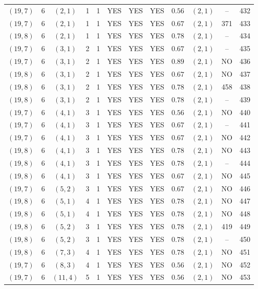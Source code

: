 \begin{longtable}{|c|c|c|c|c|c|c|c|c|c|c|c|}
$(19,7)$ & 6 & $(2,1)$ & 1 & 1 & YES & YES & YES & $0.56$ & $(2,1)$ & -- & 432\\
$(19,7)$ & 6 & $(2,1)$ & 1 & 1 & YES & YES & YES & $0.67$ & $(2,1)$ & 371 & 433\\
$(19,8)$ & 6 & $(2,1)$ & 1 & 1 & YES & YES & YES & $0.78$ & $(2,1)$ & -- & 434\\
$(19,7)$ & 6 & $(3,1)$ & 2 & 1 & YES & YES & YES & $0.67$ & $(2,1)$ & -- & 435\\
$(19,7)$ & 6 & $(3,1)$ & 2 & 1 & YES & YES & YES & $0.89$ & $(2,1)$ & NO & 436\\
$(19,8)$ & 6 & $(3,1)$ & 2 & 1 & YES & YES & YES & $0.67$ & $(2,1)$ & NO & 437\\
$(19,8)$ & 6 & $(3,1)$ & 2 & 1 & YES & YES & YES & $0.78$ & $(2,1)$ & 458 & 438\\
$(19,8)$ & 6 & $(3,1)$ & 2 & 1 & YES & YES & YES & $0.78$ & $(2,1)$ & -- & 439\\
$(19,7)$ & 6 & $(4,1)$ & 3 & 1 & YES & YES & YES & $0.56$ & $(2,1)$ & NO & 440\\
$(19,7)$ & 6 & $(4,1)$ & 3 & 1 & YES & YES & YES & $0.67$ & $(2,1)$ & -- & 441\\
$(19,7)$ & 6 & $(4,1)$ & 3 & 1 & YES & YES & YES & $0.67$ & $(2,1)$ & NO & 442\\
$(19,8)$ & 6 & $(4,1)$ & 3 & 1 & YES & YES & YES & $0.78$ & $(2,1)$ & NO & 443\\
$(19,8)$ & 6 & $(4,1)$ & 3 & 1 & YES & YES & YES & $0.78$ & $(2,1)$ & -- & 444\\
$(19,8)$ & 6 & $(4,1)$ & 3 & 1 & YES & YES & YES & $0.67$ & $(2,1)$ & NO & 445\\
$(19,7)$ & 6 & $(5,2)$ & 3 & 1 & YES & YES & YES & $0.67$ & $(2,1)$ & NO & 446\\
$(19,8)$ & 6 & $(5,1)$ & 4 & 1 & YES & YES & YES & $0.78$ & $(2,1)$ & NO & 447\\
$(19,8)$ & 6 & $(5,1)$ & 4 & 1 & YES & YES & YES & $0.78$ & $(2,1)$ & NO & 448\\
$(19,8)$ & 6 & $(5,2)$ & 3 & 1 & YES & YES & YES & $0.78$ & $(2,1)$ & 419 & 449\\
$(19,8)$ & 6 & $(5,2)$ & 3 & 1 & YES & YES & YES & $0.78$ & $(2,1)$ & -- & 450\\
$(19,8)$ & 6 & $(7,3)$ & 4 & 1 & YES & YES & YES & $0.78$ & $(2,1)$ & NO & 451\\
$(19,7)$ & 6 & $(8,3)$ & 4 & 1 & YES & YES & YES & $0.56$ & $(2,1)$ & NO & 452\\
$(19,7)$ & 6 & $(11,4)$ & 5 & 1 & YES & YES & YES & $0.56$ & $(2,1)$ & NO & 453\\

\end{longtable}
